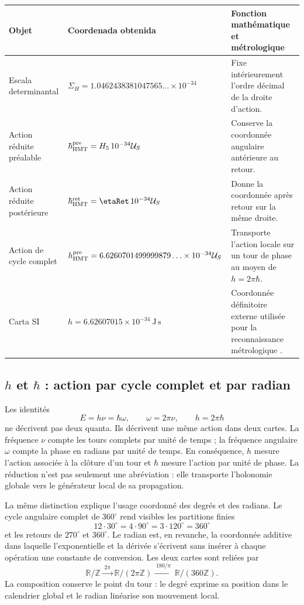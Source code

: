 \begin{center}
\begin{tabularx}{0.96\textwidth}{@{}L{0.22\textwidth}L{0.36\textwidth}Y@{}}
\toprule
Objet & Coordenada obtenida & Fonction mathématique et métrologique\\
\midrule
Escala determinantal &
\(\Sigma_H=1.0462438381047565\ldots\times10^{-34}\) &
Fixe intérieurement l'ordre décimal de la droite d'action.\\
Action réduite préalable &
\(\hbar_{\rm HMT}^{\rm pre}=H_5\,10^{-34}\mathcal U_S\) &
Conserve la coordonnée angulaire antérieure au retour.\\
Action réduite postérieure &
\(\hbar_{\rm HMT}^{\rm ret}=\etaRet\,10^{-34}\mathcal U_S\) &
Donne la coordonnée après retour sur la même droite.\\
Action de cycle complet &
\(h_{\rm HMT}^{\rm pre}=6.6260701499999879\ldots\times10^{-34}\mathcal U_S\) &
Transporte l'action locale sur un tour de phase au moyen de \(h=2\pi\hbar\).\\
Carta SI &
\(h=6.62607015\times10^{-34}\ \mathrm{J\,s}\) &
Coordonnée définitoire externe utilisée pour la reconnaissance métrologique
\cite{BIPMSI}.\\
\bottomrule
\end{tabularx}
\end{center}

\subsection{\texorpdfstring{\(h\)}{h} et
\texorpdfstring{\(\hbar\)}{h barre} : action par cycle complet et par radian}
\label{sec:accion-vuelta-radian-rev6}

Les identités
\[
 E=h\nu=\hbar\omega,\qquad
 \omega=2\pi\nu,\qquad
 h=2\pi\hbar
\]
ne décrivent pas deux quanta. Ils décrivent une même action dans deux cartes. La
fréquence \(\nu\) compte les tours complets par unité de temps ; la
fréquence angulaire \(\omega\) compte la phase en radians par unité de temps.
En conséquence, \(h\) mesure l'action associée à la clôture d'un tour et
\(\hbar\) mesure l'action par unité de phase. La réduction n'est pas seulement une
abréviation : elle transporte l'holonomie globale vers le générateur local de sa
propagation.

La même distinction explique l'usage coordonné des degrés et des radians. Le cycle
angulaire complet de \(360^\circ\) rend visibles les partitions finies
\[
 12\cdot30^\circ=4\cdot90^\circ
 =3\cdot120^\circ=360^\circ
\]
et les retours de \(270^\circ\) et \(360^\circ\). Le radian est, en revanche, la coordonnée additive dans laquelle l’exponentielle et la dérivée s’écrivent sans insérer à chaque opération une constante de conversion. Les deux cartes sont reliées par
\[
 \mathbb R/\mathbb Z
 \xrightarrow{\;2\pi\;}
 \mathbb R/(2\pi\mathbb Z)
 \xrightarrow{\;180/\pi\;}
 \mathbb R/(360\mathbb Z).
\]
La composition conserve le point du tour : le degré exprime sa position dans le calendrier global et le radian linéarise son mouvement local.


